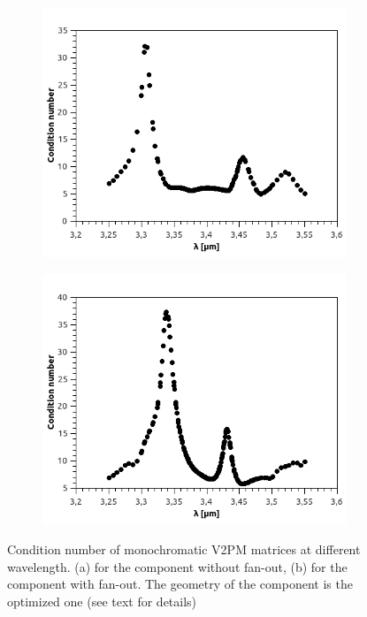 \begin{figure}
    \centering
    \begin{subfigure}{.45\textwidth}
        \centering
        \includegraphics[scale=.45]{picture/cond_BW/nofan.png}
        \subcaption{}
    \end{subfigure}%
    \hspace{.5cm}
    \begin{subfigure}{.45\textwidth}
        \centering
        \includegraphics[scale=.45]{picture/cond_BW/fanout.png}
        \subcaption{}
    \end{subfigure}
    \caption{Condition number of monochromatic V2PM matrices at different wavelength. (a) for the component without fan-out, (b) for the component with fan-out. The geometry of the component is the optimized one (see text for details)}
    \label{fig:cond_mono_multi}
\end{figure}
